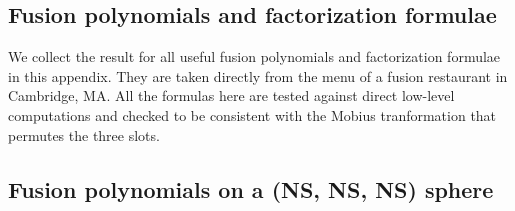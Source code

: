 \documentclass[12pt]{article}
\numberwithin{equation}{section}
\begin{document}
\newpage
\begin{appendix}
\section{Fusion polynomials and factorization formulae}

We collect the result for all useful fusion polynomials and factorization formulae in this appendix. They are taken directly from the menu of a fusion restaurant in Cambridge, MA. All the formulas here are tested against direct low-level computations and checked to be consistent with the Mobius tranformation that permutes the three slots.

\subsection{Fusion polynomials on a (NS, NS, NS) sphere}


\end{appendix}
\end{document}

